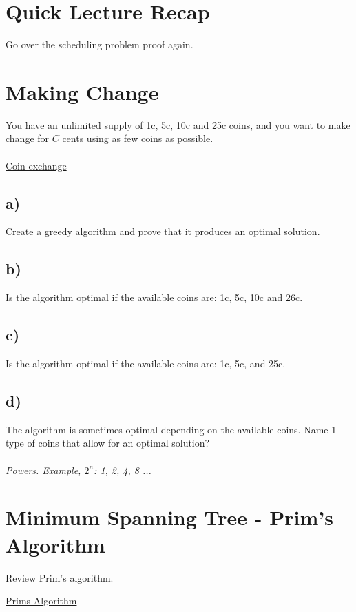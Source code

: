 \documentclass[pdf]{article}
\title{}
\author{}
\begin{document}
\section{Quick Lecture Recap}
Go over the scheduling problem proof again.
\section{Making Change}
You have an unlimited supply of 1c, 5c, 10c and 25c coins, and you want to make change for $C$ cents using as few coins as possible.\\ \\
\href{http://cse.unl.edu/~choueiry/S06-235/files/Algorithms.pdf}{Coin exchange}
\subsection*{a)}
Create a greedy algorithm and prove that it produces an optimal solution.
\subsection*{b)}
Is the algorithm optimal if the available coins are: 1c, 5c, 10c and 26c. %
\subsection*{c)}
Is the algorithm optimal if the available coins are: 1c, 5c, and 25c. %
\subsection*{d)}
The algorithm is sometimes optimal depending on the available coins. Name 1 type of coins that allow for an optimal solution? \\ \\ \textit{Powers. Example, $2^n$:  1, 2, 4, 8 ...}

\section{Minimum Spanning Tree - Prim's Algorithm}
Review Prim's algorithm. 

\href{http://www.mathcs.emory.edu/~cheung/Courses/171/Syllabus/11-Graph/prim2.html}{Prims Algorithm}
\end{document}
